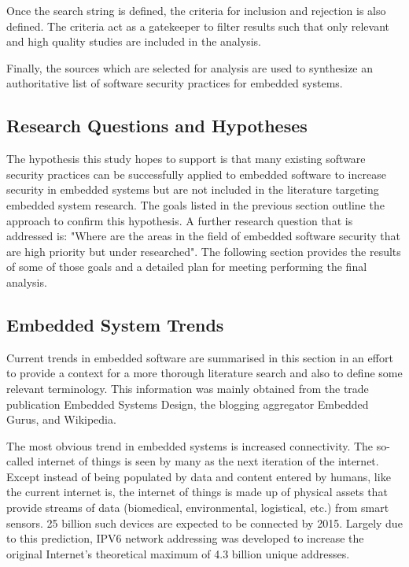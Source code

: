 \documentclass[final,conference,10pt]{IEEEtran}
\begin{document}
Once the search string is defined, the criteria for inclusion and rejection is also defined.  The criteria act as a gatekeeper to filter results such that only relevant and high quality studies are included in the analysis.

Finally, the sources which are selected for analysis are used to synthesize an authoritative list of software security practices for embedded systems.  

\subsection{Research Questions and Hypotheses}

The hypothesis this study hopes to support is that many existing software security practices can be successfully applied to embedded software to increase security in embedded systems but are not included in the literature targeting embedded system research.  The goals listed in the previous section outline the approach to confirm this hypothesis.  A further research question that is addressed is: "Where are the areas in the field of embedded software security that are high priority but under researched". The following section provides the results of some of those goals and a detailed plan for meeting performing the final analysis.

\subsection{Embedded System Trends}

Current trends in embedded software are summarised in this section in an effort to provide a context for a more thorough literature search and also to define some relevant terminology.  This information was mainly obtained from the trade publication Embedded Systems Design, the blogging aggregator Embedded Gurus, and Wikipedia.  

The most obvious trend in embedded systems is increased connectivity.  The so-called internet of things is seen by many as the next iteration of the internet. Except instead of being populated by data and content entered by humans, like the current internet is, the internet of things is made up of physical assets that provide streams of data (biomedical, environmental, logistical, etc.) from smart sensors.  25 billion such devices are expected to be connected by 2015. Largely due to this prediction, IPV6 network addressing was developed to increase the original Internet’s theoretical maximum of 4.3 billion unique addresses.  
\end{document}
